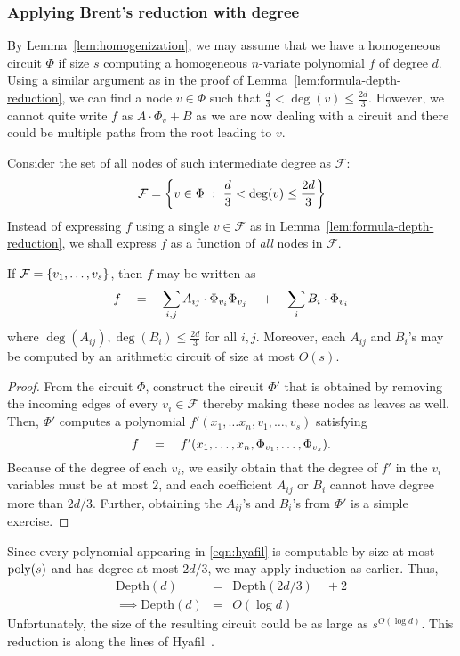 \subsubsection{Applying Brent's reduction with degree}

By Lemma~\ref{lem:homogenization}, we may assume that we have a homogeneous circuit $\Phi$ if size $s$ computing a homogeneous $n$-variate polynomial $f$ of degree $d$. Using a similar argument as in the proof of Lemma~\ref{lem:formula-depth-reduction}, we can find a node $v \in \Phi$ such that $\frac{d}{3} < \deg(v) \leq \frac{2d}{3}$. However, we cannot quite write $f$ as $A \cdot \Phi_v + B$ as we are now dealing with a circuit and there could be multiple paths from the root leading to $v$.

Consider the set of all nodes of such intermediate degree as $\mathcal{F}$:
\[
\mathcal{F} = \left\{{v\in \Phi}\ : \ {\frac{d}{3} < \deg(v)\leq \frac{2d}{3}}\right\}
\]
Instead of expressing $f$ using a single $v\in \mathcal{F}$ as in Lemma~\ref{lem:formula-depth-reduction}, we shall express $f$ as a function of \emph{all} nodes in $\mathcal{F}$. 

\begin{claim}
If $\mathcal{F} = \left\{v_1,\dots, v_s\right\}$, then $f$ may be written as
\begin{equation}\label{eqn:hyafil}
f \quad = \quad \sum_{i,j} A_{ij} \cdot \Phi_{v_i} \Phi_{v_j} \quad + \quad \sum_i B_i \cdot \Phi_{v_i}
\end{equation}
where $\deg(A_{ij}), \deg(B_i) \leq \frac{2d}{3}$ for all $i,j$. Moreover, each $A_{ij}$ and $B_i$'s may be computed by an arithmetic circuit of size at most $O(s)$. 
\end{claim}
\begin{proof}
From the circuit $\Phi$, construct the circuit $\Phi'$ that is obtained by removing the incoming edges of every $v_i \in \mathcal{F}$ thereby making these nodes as leaves as well. Then, $\Phi'$ computes a polynomial $f'(x_1,\dots x_n, v_1,\dots, v_s)$ satisfying 
\[
f \quad = \quad f'(x_1,\dots, x_n, \Phi_{v_1},\dots, \Phi_{v_s}).
\]
Because of the degree of each $v_i$, we easily obtain that the degree of $f'$ in the $v_i$ variables must be at most $2$, and each coefficient $A_{ij}$ or $B_i$ cannot have degree more than $2d/3$. Further, obtaining the $A_{ij}$'s and $B_i$'s from $\Phi'$ is a simple exercise. 
\end{proof}

Since every polynomial appearing in \eqref{eqn:hyafil} is computable by size at most $\mathrm{poly}(s)$ and has degree at most $2d/3$, we may apply induction as earlier. Thus,
\begin{eqnarray*}
\mathrm{Depth}(d) & = & \mathrm{Depth}(2d/3) \quad + 2\\
\implies \mathrm{Depth}(d) & = & O(\log d)
\end{eqnarray*}
Unfortunately, the size of the resulting circuit could be as large as $s^{O(\log d)}$.  This reduction is along the lines of Hyafil~\cite{Hyafil1978}. 


